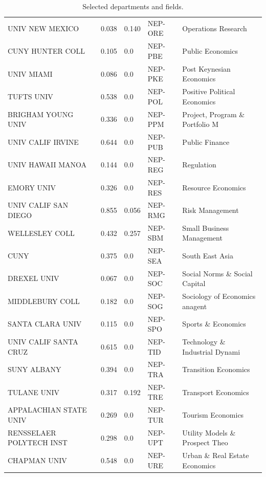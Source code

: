 \documentclass[]{article}
\begin{document}
\begin{table}
\begin{tabular}{lllll}
        UNIV NEW MEXICO          & 0.038 & 0.140       & NEP-ORE   & Operations Research\\
        CUNY HUNTER COLL         & 0.105 & 0.0         & NEP-PBE   & Public Economics\\
        UNIV MIAMI               & 0.086 & 0.0         & NEP-PKE   & Post Keynesian Economics\\
        TUFTS UNIV               & 0.538 & 0.0         & NEP-POL   & Positive Political Economics\\
        BRIGHAM YOUNG UNIV       & 0.336 & 0.0         & NEP-PPM   & Project, Program \& Portfolio M\\
        UNIV CALIF IRVINE        & 0.644 & 0.0         & NEP-PUB   & Public Finance\\
        UNIV HAWAII MANOA        & 0.144 & 0.0         & NEP-REG   & Regulation\\
        EMORY UNIV               & 0.326 & 0.0         & NEP-RES   & Resource Economics\\
        UNIV CALIF SAN DIEGO     & 0.855 & 0.056       & NEP-RMG   & Risk Management\\
        WELLESLEY COLL           & 0.432 & 0.257       & NEP-SBM   & Small Business Management\\
        CUNY                     & 0.375 & 0.0         & NEP-SEA   & South East Asia\\
        DREXEL UNIV              & 0.067 & 0.0         & NEP-SOC   & Social Norms \& Social Capital\\
        MIDDLEBURY COLL          & 0.182 & 0.0         & NEP-SOG   & Sociology of Economics anagent\\
        SANTA CLARA UNIV         & 0.115 & 0.0         & NEP-SPO   & Sports \& Economics\\
        UNIV CALIF SANTA CRUZ    & 0.615 & 0.0         & NEP-TID   & Technology \& Industrial Dynami\\
        SUNY ALBANY              & 0.394 & 0.0         & NEP-TRA   & Transition Economics\\
        TULANE UNIV              & 0.317 & 0.192       & NEP-TRE   & Transport Economics\\
        APPALACHIAN STATE UNIV   & 0.269 & 0.0         & NEP-TUR   & Tourism Economics\\
        RENSSELAER POLYTECH INST & 0.298 & 0.0         & NEP-UPT   & Utility Models \& Prospect Theo\\
        CHAPMAN UNIV             & 0.548 & 0.0         & NEP-URE   & Urban \& Real Estate Economics \\ \hline
    \end{tabular}
    \caption{Selected departments and fields.}
    \label{tab:dep_field}
\end{table}
\end{document}
